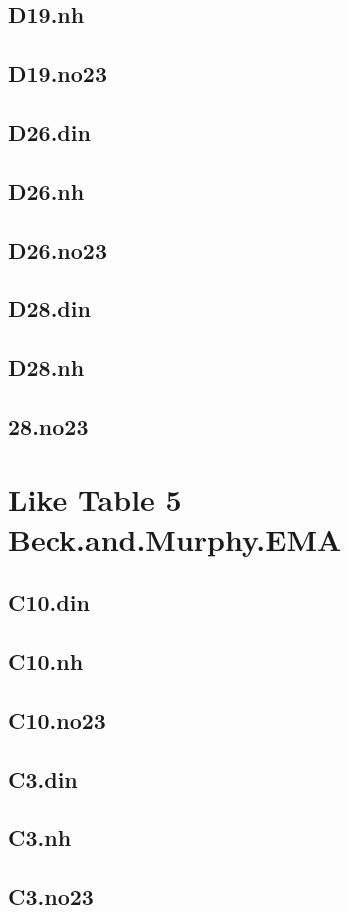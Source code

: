 \documentclass[12pt]{amsart}
\begin{document}
\subsection{D19.nh}
\subsection{D19.no23}
\subsection{D26.din}
\subsection{D26.nh}
\subsection{D26.no23}
\subsection{D28.din}
\subsection{D28.nh}
\subsection{28.no23}

\section{Like Table 5 Beck.and.Murphy.EMA}
\subsection{C10.din}
\subsection{C10.nh}
\subsection{C10.no23}
\subsection{C3.din}
\subsection{C3.nh}
\subsection{C3.no23}
\end{document}
